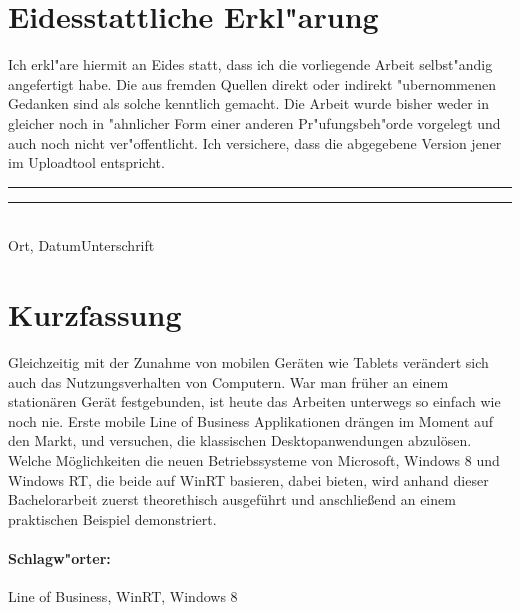 \documentclass[a4paper,bibtotoc,oneside]{scrbook}
\begin{document}
\newpage


\section*{Eidesstattliche Erkl"arung}\thispagestyle{empty}
\glqq Ich erkl"are hiermit an Eides statt, dass ich die vorliegende Arbeit selbst"andig angefertigt habe. 
Die aus fremden Quellen direkt oder indirekt "ubernommenen Gedanken sind als solche kenntlich gemacht. 
Die Arbeit wurde bisher weder in gleicher noch in "ahnlicher Form einer anderen Pr"ufungsbeh"orde vorgelegt
und auch noch nicht ver"offentlicht. Ich versichere, dass die abgegebene Version jener im Uploadtool entspricht.\grqq\\[5\baselineskip]
\rule{5cm}{0.2pt}\hfill\rule{5cm}{0.2pt}\\
\phantom{Datum }Ort, Datum\hfill Unterschrift\hspace{15mm}

\newpage

\section*{Kurzfassung}\thispagestyle{empty}
Gleichzeitig mit der Zunahme von mobilen Geräten wie Tablets verändert sich auch das Nutzungsverhalten von Computern. War man früher an einem stationären Gerät festgebunden, ist heute das Arbeiten unterwegs so einfach wie noch nie. Erste mobile Line of Business Applikationen drängen im Moment auf den Markt, und versuchen, die klassischen Desktopanwendungen abzulösen.
\newline
Welche Möglichkeiten die neuen Betriebssysteme von Microsoft, Windows 8 und Windows RT, die beide auf WinRT basieren, dabei bieten, wird anhand dieser Bachelorarbeit zuerst theorethisch ausgeführt und anschließend an einem praktischen Beispiel demonstriert.
\\ \vfill
\paragraph*{Schlagw"orter:} Line of Business, WinRT, Windows 8

\newpage
\end{document}
